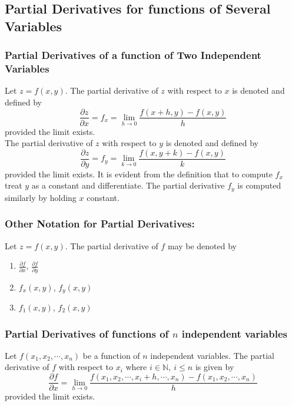\documentclass[14pt]{article}
\begin{document}
    \subsection{Partial Derivatives for functions of Several Variables}
    \subsubsection{Partial Derivatives of a function of Two Independent Variables}
    Let $z=f(x,y)$. The partial derivative of $z$ with respect to $x$ is denoted and defined by
    $$\frac{\partial z}{\partial x}=f_x=\lim\limits_{h\rightarrow 0}\frac{f(x+h, y)-f(x,y)}{h}$$
    provided the limit exists.\\
    The partial derivative of $z$ with respect to $y$ is denoted and defined by
    $$\frac{\partial z}{\partial y}=f_y=\lim\limits_{k\rightarrow 0}\frac{f(x, y+k)-f(x,y)}{k}$$
    provided the limit exists. It is evident from the definition that to compute $f_x$ treat $y$ as a constant and differentiate. The partial derivative $f_y$ is computed similarly by holding $x$ constant.
    \subsubsection{Other Notation for Partial Derivatives:}
    Let $z=f(x,y)$. The partial derivative of $f$ may be denoted by
    \begin{enumerate}
        \item $\frac{\partial f}{\partial x}$, $\frac{\partial f}{\partial y}$
        \item $f_x(x,y)$, $f_y(x,y)$
        \item $f_1(x,y)$, $f_2(x,y)$
    \end{enumerate} 
    \subsubsection{Partial Derivatives of functions of $n$ independent variables}
    Let $f(x_1, x_2, \cdots, x_n)$ be a function of $n$ independent variables. The partial derivative of $f$ with respect to $x_i$ where $i\in \mathbb{N},\ i\leq n$ is given by
    $$\frac{\partial f}{\partial x}=\lim\limits_{h\rightarrow 0}\frac{f(x_1, x_2, \cdots, x_i+h, \cdots, x_n)-f(x_1, x_2, \cdots, x_n)}{h}$$
    provided the limit exists.
\end{document}

